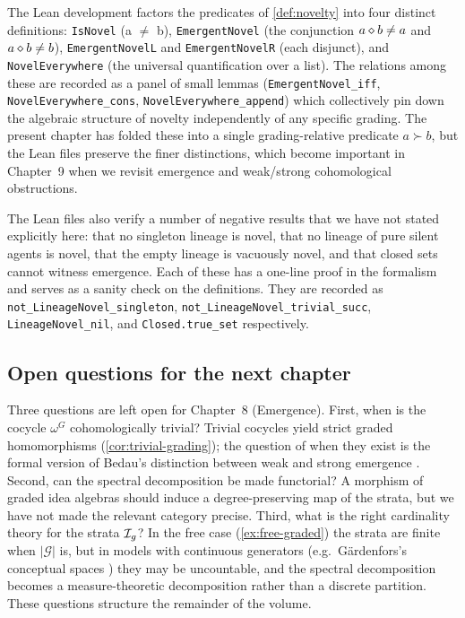 The Lean development factors the predicates of
\cref{def:novelty} into four distinct definitions:
\texttt{IsNovel} (a $\neq$ b), \texttt{EmergentNovel} (the conjunction
$a\mathbin{\diamond} b\neq a$ and $a\mathbin{\diamond} b\neq b$), \texttt{EmergentNovelL}
and \texttt{EmergentNovelR} (each disjunct), and
\texttt{NovelEverywhere} (the universal quantification over a list).
The relations among these are recorded as a panel of small lemmas
(\texttt{EmergentNovel\_iff}, \texttt{NovelEverywhere\_cons},
\texttt{NovelEverywhere\_append}) which collectively pin down the
algebraic structure of novelty independently of any specific grading.
The present chapter has folded these into a single grading-relative
predicate $a\succ b$, but the Lean files preserve the finer
distinctions, which become important in Chapter~9 when we revisit
emergence and weak/strong cohomological obstructions.

The Lean files also verify a number of negative results that we have
not stated explicitly here: that no singleton lineage is novel, that
no lineage of pure silent agents is novel, that the empty lineage is
vacuously novel, and that closed sets cannot witness emergence.
Each of these has a one-line proof in the formalism and serves as a
sanity check on the definitions. They are recorded as
\texttt{not\_LineageNovel\_singleton},
\texttt{not\_LineageNovel\_trivial\_succ},
\texttt{LineageNovel\_nil}, and \texttt{Closed.true\_set}
respectively.

\subsection*{Open questions for the next chapter}

Three questions are left open for Chapter~8 (Emergence). First, when
is the cocycle $\omega^G$ cohomologically trivial? Trivial cocycles
yield strict graded homomorphisms (\cref{cor:trivial-grading}); the
question of when they exist is the formal version of Bedau's
distinction between weak and strong emergence \cite{Bedau1997}.
Second, can the spectral decomposition be made functorial? A morphism
of graded idea algebras should induce a degree-preserving map of the
strata, but we have not made the relevant category precise.
Third, what is the right cardinality theory for the strata
$\mathcal{I}_g$? In the free case (\cref{ex:free-graded}) the strata are
finite when $|\mathcal{G}|$ is, but in models with continuous
generators (e.g.\ Gärdenfors's conceptual spaces \cite{Gardenfors2000})
they may be uncountable, and the spectral decomposition becomes a
measure-theoretic decomposition rather than a discrete partition.
These questions structure the remainder of the volume.

